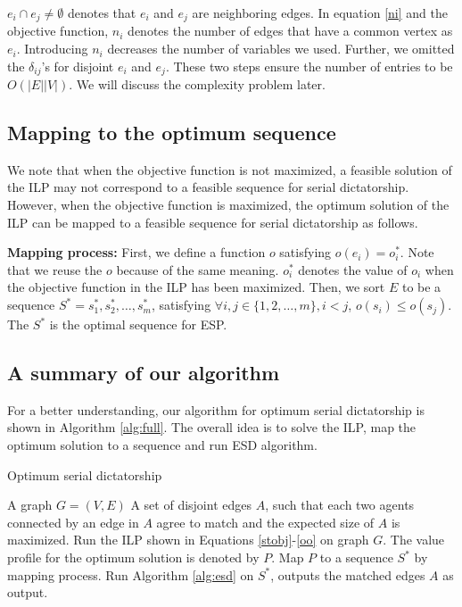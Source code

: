 \documentclass[letterpaper]{article}
\begin{document}
 $e_i\cap e_j\neq \emptyset$ denotes that $e_i$ and $e_j$ are neighboring edges. 
In equation \ref{ni} and the objective function, $n_i$ denotes the number of edges that have a common vertex as $e_i$.
Introducing $n_i$ decreases the number of variables we used.
Further, we omitted the $\delta_{ij}$'s for disjoint $e_i$ and $e_j$.
These two steps ensure the number of entries to be $O(|E||V|)$.
We will discuss the complexity problem later.

\subsection{Mapping to the optimum sequence}
We note that when the objective function is not maximized, a feasible solution of the ILP may not correspond to a feasible sequence for serial dictatorship.
However, when the objective function is maximized, the optimum solution of the ILP can be mapped to a feasible sequence for serial dictatorship as follows.

\textbf{Mapping process: }First, we define a function $o$ satisfying $o(e_i)=o_i^*$. 
Note that we reuse the $o$ because of the same meaning.
$o_i^*$ denotes the value of $o_i$ when the objective function in the ILP has been maximized.
Then, we sort $E$ to be a sequence $S^*=s_1^*,s_2^*,\ldots,s_m^*$, satisfying $\forall i,j\in\{1,2,\ldots,m\},i<j$, $o(s_i)\leq o(s_j)$.
The $S^*$ is the optimal sequence for ESP.

\subsection{A summary of our algorithm}
For a better understanding, our algorithm for optimum serial dictatorship is shown in Algorithm \ref{alg:full}.
The overall idea is to solve the ILP, map the optimum solution to a sequence and run ESD algorithm.
\begin{algorithm}
	\caption{Optimum serial dictatorship}
	\label{alg:full}
	\begin{algorithmic}[1]
		\Require
		A graph $G=(V,E)$
		\Ensure A set of disjoint edges $A$, such that each two agents connected by an edge in $A$ agree to match and the expected size of $A$ is maximized. 
		\State Run the ILP shown in Equations \ref{stobj}-\ref{oo} on graph $G$. The value profile for the optimum solution is denoted by $P$. 
		\State Map $P$ to a sequence $S^*$ by mapping process. 
		\State Run Algorithm \ref{alg:esd} on $S^*$, outputs the matched edges $A$ as output.
	\end{algorithmic}
\end{algorithm}
\end{document}
